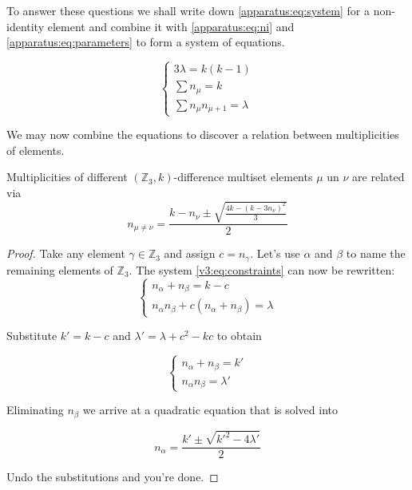     To answer these questions we shall write down \eqref{apparatus:eq:system} for a non-identity element and combine it with \eqref{apparatus:eq:ni} and \eqref{apparatus:eq:parameters} to form a system of equations.

    \begin{equation}
        \label{v3:eq:constraints}
        \begin{cases}
            3\lambda = k(k-1) \\
            \sum n_\mu = k \\
            \sum n_\mu n_{\mu+1} = \lambda
        \end{cases}
    \end{equation}

    We may now combine the equations to discover a relation between multiplicities of elements.

    \begin{theorem}
        \label{v3:theorem:relations}
        Multiplicities of different $(\mathbb Z_3,k)$-difference multiset elements $\mu$ un $\nu$ are related via
        \begin{equation}
            \label{v3:eq:relations}
            n_{\mu\neq \nu} = \frac{k-n_\nu \pm \sqrt{\frac{4k-(k-3n_\nu)^2}{3}}}{2}
        \end{equation}
    \end{theorem}

    \begin{proof}
        Take any element $\gamma \in \mathbb Z_3$ and assign $c = n_\gamma$. Let's use $\alpha$ and $\beta$ to name the remaining elements of $\mathbb Z_3$. The system \eqref{v3:eq:constraints} can now be rewritten:
        \begin{equation}
            \begin{cases}
                n_\alpha + n_\beta = k - c \\
                n_\alpha n_\beta + c (n_\alpha + n_\beta)  = \lambda 
            \end{cases}
        \end{equation}
        
        Substitute $k'=k-c$ and $\lambda' = \lambda + c^2-kc$ to obtain
        
        \begin{equation}
            \begin{cases}
                n_\alpha + n_\beta = k' \\
                n_\alpha n_\beta = \lambda'
            \end{cases}
        \end{equation}
        
        Eliminating $n_\beta$ we arrive at a quadratic equation that is solved into
        
        \begin{equation}
            n_\alpha = \frac{k' \pm \sqrt{k'^2-4\lambda'}}{2}
        \end{equation}
        
        Undo the substitutions and you're done.
    \end{proof}

